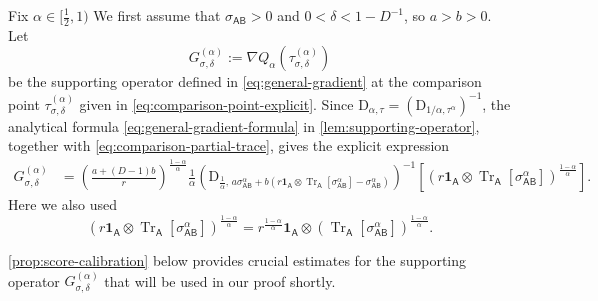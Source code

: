 \documentclass[11pt,reqno]{amsart}
\theoremstyle{definition}
\DeclareMathOperator{\Tr}{Tr}
\newcommand{\I}{\mathbf 1}
\newcommand{\A}{\mathsf{A}}
\newcommand{\B}{\mathsf{B}}
\begin{document}
Fix $\alpha\in[\frac12,1)$ 
We first assume that $\sigma_{\A\B}>0$ and
$0<\delta<1-D^{-1}$, so $a>b>0$.
Let
\begin{equation}\label{eq:specialized-supporting-operator}
 G_{\sigma,\delta}^{(\alpha)}
 := \nabla Q_{\alpha}(\tau_{\sigma,\delta}^{(\alpha)})
\end{equation}
be the supporting operator defined in \eqref{eq:general-gradient} at the
comparison point $\tau_{\sigma,\delta}^{(\alpha)}$ given in \cref{eq:comparison-point-explicit}.  
Since
$\mathrm D_{\alpha,\tau}
 =(\mathrm D_{1/\alpha,\tau^\alpha})^{-1}$, the analytical formula
\cref{eq:general-gradient-formula} in \cref{lem:supporting-operator}, together with
\cref{eq:comparison-partial-trace}, gives the explicit expression
\begin{align}
 G_{\sigma,\delta}^{(\alpha)}
 & =
 \left(\frac{a+(D-1)b}{r}\right)^{\frac{1-\alpha}{\alpha}}
 \frac1\alpha
 \left(
 \mathrm D_{\frac1\alpha,\,
 a\sigma_{\A\B}^\alpha
 +b\left(
 r\I_{\A}\otimes\Tr_{\A}[\sigma_{\A\B}^\alpha]
 -\sigma_{\A\B}^\alpha
 \right)}
 \right)^{-1}\left[
 \left(
 r\I_{\A}\otimes\Tr_{\A}[\sigma_{\A\B}^\alpha]
 \right)^{\frac{1-\alpha}{\alpha}}
 \right].
 \label{eq:explicit-support-score}
\end{align}
Here we also used
\[
 \left(
 r\I_{\A}\otimes\Tr_{\A}[\sigma_{\A\B}^\alpha]
 \right)^{\frac{1-\alpha}{\alpha}}
 =r^{\frac{1-\alpha}{\alpha}}\I_{\A}\otimes
 \left(\Tr_{\A}[\sigma_{\A\B}^\alpha]\right)^{\frac{1-\alpha}{\alpha}}.
\]
%

\cref{prop:score-calibration} below provides crucial estimates for the supporting operator $G_{\sigma,\delta}^{(\alpha)}$ that will be used in our proof shortly.
\end{document}
